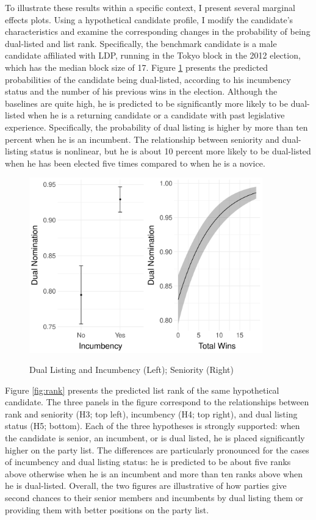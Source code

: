 \documentclass[a4paper, 11pt]{article}
\begin{document}
To illustrate these results within a specific context, I present several marginal effects plots. Using a hypothetical candidate profile, I modify the candidate's characteristics and examine the corresponding changes in the probability of being dual-listed and list rank. Specifically, the benchmark candidate is a male candidate affiliated with LDP, running in the Tokyo block in the 2012 election, which has the median block size of 17. Figure \ref{fig:dual} presents the predicted probabilities of the candidate being dual-listed, according to his incumbency status and the number of his previous wins in the election. Although the baselines are quite high, he is predicted to be significantly more likely to be dual-listed when he is a returning candidate or a candidate with past legislative experience. Specifically, the probability of dual listing is higher by more than ten percent when he is an incumbent. The relationship between seniority and dual-listing status is nonlinear, but he is about 10 percent more likely to be dual-listed when he has been elected five times compared to when he is a novice. 

\begin{figure}[!htbp]
	\caption{Dual Listing and Incumbency (Left); Seniority (Right)}
	\includegraphics[width = 0.9\textwidth]{../figure/paper/h4_h5.pdf}
	\label{fig:dual}
\end{figure}

Figure \ref{fig:rank} presents the predicted list rank of the same hypothetical candidate. The three panels in the figure correspond to the relationships between rank and seniority (H3; top left), incumbency (H4; top right), and dual listing status (H5; bottom). Each of the three hypotheses is strongly supported: when the candidate is senior, an incumbent, or is dual listed, he is placed significantly higher on the party list. The differences are particularly pronounced for the cases of incumbency and dual listing status: he is predicted to be about five ranks above otherwise when he is an incumbent and more than ten ranks above when he is dual-listed. Overall, the two figures are illustrative of how parties give second chances to their senior members and incumbents by dual listing them or providing them with better positions on the party list. 
\end{document}
